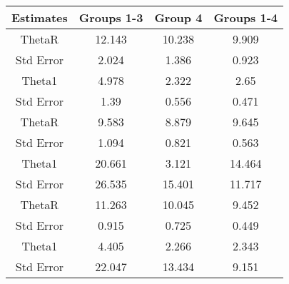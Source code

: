 \begin{tabular}{cccc}
\hline
Estimates & Groups 1-3 & Group 4 & Groups 1-4 \\
\hline
ThetaR & 12.143 & 10.238 & 9.909 \\
Std Error & 2.024 & 1.386 & 0.923 \\
Theta1 & 4.978 & 2.322 & 2.65 \\
Std Error & 1.39 & 0.556 & 0.471 \\
ThetaR & 9.583 & 8.879 & 9.645 \\
Std Error & 1.094 & 0.821 & 0.563 \\
Theta1 & 20.661 & 3.121 & 14.464 \\
Std Error & 26.535 & 15.401 & 11.717 \\
ThetaR & 11.263 & 10.045 & 9.452 \\
Std Error & 0.915 & 0.725 & 0.449 \\
Theta1 & 4.405 & 2.266 & 2.343 \\
Std Error & 22.047 & 13.434 & 9.151 \\
\hline
\end{tabular}

